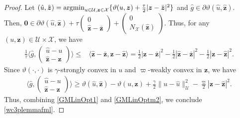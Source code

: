 \documentclass[10pt,reqno]{amsart}
\newcommand{\argmin}{\operatorname{argmin}}
\newcommand{\1}{{\chi}}
\def\leq{\leqslant}
\def\geq{\geqslant}
\numberwithin{equation}{section}
\theoremstyle{thmlemcorr}
\numberwithin{theorem}{section}
\theoremstyle{thmlemcorr*}
\theoremstyle{defi}
\theoremstyle{remexample}
\theoremstyle{ass}
\begin{document}
\begin{proof}
	Let $(\hat{u}, \hat{\boldsymbol{z}})=\argmin_{u\in \mathcal{U}, \boldsymbol{z}\in \mathcal{X}}\{\vartheta(u, \boldsymbol{z}) + \frac{\tau}{2}|\boldsymbol{z}-\Bar{\boldsymbol{z}}|^2\}$ and $\hat{g}\in \partial\vartheta(\hat{u}, \hat{\boldsymbol{z}})$. Then,  $
		\boldsymbol{0}\in \partial\vartheta(\hat{u}, \hat{\boldsymbol{z}}) + \tau\begin{pmatrix}0\\ \hat{\boldsymbol{z}}-\bar{\boldsymbol{z}}\end{pmatrix}+\begin{pmatrix}0 \\ {N}_{\mathcal{X}}(\hat{\boldsymbol{z}})\end{pmatrix}$.
	Thus, for any $(u, \boldsymbol{z})\in \mathcal{U}\times\mathcal{X}$, we have
	\begin{align}
		\label{GMLinOpt1}
		\frac{1}{\tau}\bigg\langle \hat{g}, \begin{pmatrix}\hat{u}-u\\ \hat{\boldsymbol{z}}-\boldsymbol{z}\end{pmatrix}\bigg\rangle\leq&  \langle \hat{\boldsymbol{z}} - \bar{\boldsymbol{z}}, \boldsymbol{z} - \hat{\boldsymbol{z}}\rangle=   \frac{1}{2}|\boldsymbol{z}-\bar{\boldsymbol{z}}|^2-\frac{1}{2}|\hat{\boldsymbol{z}}-\bar{\boldsymbol{z}}|^2-\frac{1}{2}|\boldsymbol{z}-\hat{\boldsymbol{z}}|^2.
	\end{align}
	Since $\vartheta(\cdot, \cdot)$ is $\gamma$-strongly convex in $u$ and $\varpi$-weakly convex in $\boldsymbol{z}$, we have
	\begin{align}
		\label{GMLinOptm2}
		\bigg\langle \hat{g}, \begin{pmatrix}\hat{u}-u\\ \hat{\boldsymbol{z}}-\boldsymbol{z}\end{pmatrix}\bigg\rangle \geq \vartheta(\hat{u}, \hat{\boldsymbol{z}}) - \vartheta(u, \boldsymbol{z}) + \frac{\gamma}{2}\|u-\hat{u}\|_{\mathcal{U}}^2 - \frac{\varpi}{2}|\boldsymbol{z} - \hat{\boldsymbol{z}}|^2.  
	\end{align}
	Thus, combining \eqref{GMLinOpt1} and \eqref{GMLinOptm2}, we conclude \eqref{wc3plemmafml}. 
\end{proof}
\end{document}
